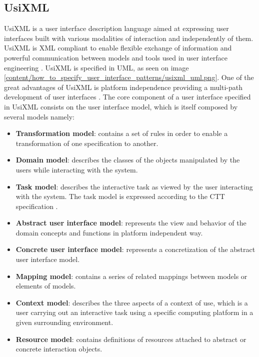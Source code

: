 \subsection{UsiXML}
\label{subsection:UsiXML}
UsiXML is a user interface description language aimed at expressing user interfaces built with various modalities of interaction and independently of them. UsiXML is XML compliant to enable flexible exchange of information and powerful communication between models and tools used in user interface engineering \cite{UsiXML_USer_Interface_eXtensible_Markup_Language}. UsiXML is specified in UML, as seen on image \ref{content/how_to_specify_user_interface_patterns/usixml_uml.png}. One of the great advantages of UsiXML is platform independence providing a multi-path development of user interfaces \cite{UsiXML_a_Language_Supporting_Multi-Path_Development_of_User_Interfaces}.
The core component of a user interface specified in UsiXML consists on the user interface model, which is itself composed by several models namely:
\begin{itemize}
\item \textbf{Transformation model}: contains a set of rules in order to enable a transformation of one specification to another.
\item \textbf{Domain model}: describes the classes of the objects manipulated by the users while interacting with the system.
\item \textbf{Task model}: describes the interactive task as viewed by the user interacting with the system. The task model is expressed according to the CTT specification \cite{ConcurTaskTrees_A_Diagrammatic_Notation_for_Specifying_Task_Models}.
\item \textbf{Abstract user interface model}: represents the view and behavior of the domain concepts and functions in platform independent way.
\item \textbf{Concrete user interface model}: represents a concretization of the abstract user interface model.
\item \textbf{Mapping model}: contains a series of related mappings between models or elements of models.
\item \textbf{Context model}: describes the three aspects of a context of use, which is a user carrying out an interactive task using a specific computing platform in a given surrounding environment.
\item \textbf{Resource model}: contains definitions of resources attached to abstract or concrete interaction objects.
\end{itemize}


